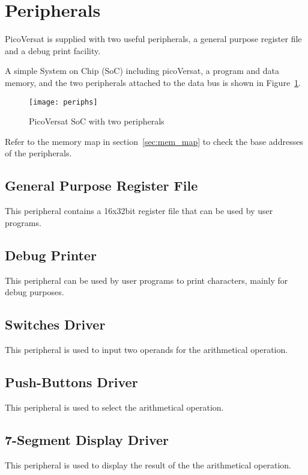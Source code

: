 \section{Peripherals}
\label{sec:periphs}

PicoVersat is supplied with two useful peripherals, a general purpose register
file and a debug print facility.

A simple System on Chip
(SoC) including picoVersat, a program and data memory, and the two peripherals
attached to the data bus is shown in Figure~\ref{fig:periphs}.

\begin{figure}[!htbp]
    \centerline{\texttt{[image: periphs]}}
    \vspace{0cm}\caption{PicoVersat SoC with two peripherals}
    \label{fig:periphs}
\end{figure}

Refer to the memory map in section~\ref{sec:mem_map} to check the base addresses
of the peripherals.

\subsection{General Purpose Register File}

This peripheral contains a 16x32bit register file that can be used by user
programs. 

\subsection{Debug Printer}

This peripheral can be used by user programs to print characters, mainly for
debug purposes.

\subsection{Switches Driver}

This peripheral is used to input two operands for the arithmetical operation.

\subsection{Push-Buttons Driver}
This peripheral is used to select the arithmetical operation.

\subsection{7-Segment Display Driver}
This peripheral is used to display the result of the the arithmetical operation.

